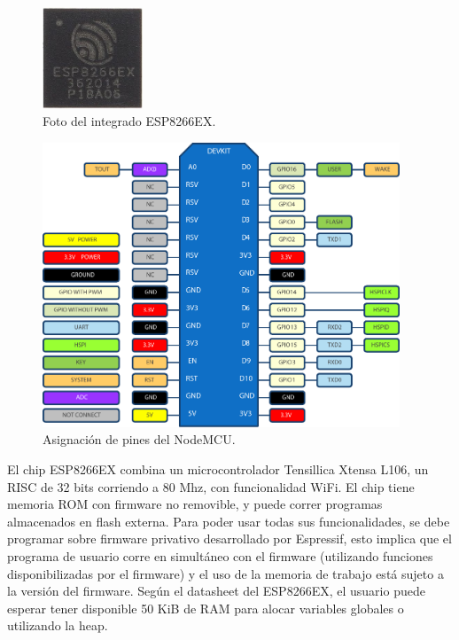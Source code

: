 \begin{figure}[ht!]
	\begin{center}
		\includegraphics[width=3cm]{imagenes/esp8266ex.jpg}
		\caption{Foto del integrado ESP8266EX.}
		\label{fig:esp8266ex}
	\end{center}
\end{figure}

\begin{figure}[ht!]
	\begin{center}
		\includegraphics[width=0.95\textwidth]{imagenes/nodemcu-pinout.pdf}
		\caption{Asignación de pines del NodeMCU.}
		\label{fig:nodemcu-pinout}
	\end{center}
\end{figure}

El chip ESP8266EX combina un microcontrolador Tensillica Xtensa L106, un RISC de 32 bits corriendo a 80 Mhz, con funcionalidad WiFi. \cite{ESP8266Datasheet} El chip tiene memoria ROM con firmware no removible, y puede correr programas almacenados en flash externa. Para poder usar todas sus funcionalidades, se debe programar sobre firmware privativo desarrollado por Espressif, esto implica que el programa de usuario corre en simultáneo con el firmware (utilizando funciones disponibilizadas por el firmware) y el uso de la memoria de trabajo está sujeto a la versión del firmware. Según el datasheet del ESP8266EX, el usuario puede esperar tener disponible 50 KiB de RAM para alocar variables globales o utilizando la heap.

